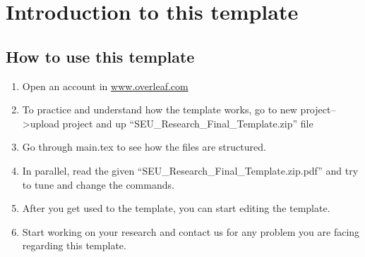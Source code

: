 \chapter{Introduction to this template}\label{chap:intro}
\section{How to use this template}
\begin{enumerate}
    \item Open an account in \href{www.overleaf.com}{www.overleaf.com}
    \item To practice and understand how the template works, go to new project-->upload project and up ``SEU\_Research\_Final\_Template.zip'' file
    \item Go through main.tex to see how the files are structured. 
    \item In parallel, read the given ``SEU\_Research\_Final\_Template.zip.pdf'' and try to tune and change the commands.
    \item After you get used to the template, you can start editing the template.
    \item Start working on your research and contact us for any problem you are facing regarding this template.
\end{enumerate}

\endinput